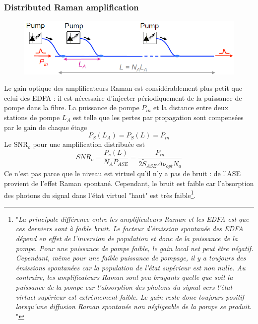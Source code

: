 \subsubsection{Distributed Raman amplification}
	\begin{figure}
	\vspace{-5mm}
	\includegraphics[scale=0.35]{ch6/image21}
	\end{figure}
Le gain optique des amplificateurs Raman est considérablement plus petit que celui des EDFA : il est 
nécessaire d'injecter périodiquement de la puissance de pompe dans la fibre. La puissance de pompe 
$P_{in}$ et la distance entre deux stations de pompe $L_A$ est telle que les pertes par propagation 
sont compensées par le gain de chaque étage
\begin{equation}
P_S(L_A)=P_S(L)=P_{in}
\end{equation}
Le SNR$_o$ pour une amplification distribuée est
\begin{equation}
SN{R_o} = \frac{{{P_s}(L)}}{{{N_A}P_{ASE}^{}}} = \frac{{{P_{in}}}}{{2{{\tilde S}_{ASE}}\Delta {\nu _{opt}}{N_a}}}
\end{equation}
Ce n'est pas parce que le niveau est virtuel qu'il n'y a pas de bruit : de l'ASE provient de l'effet Raman
spontané. Cependant, le bruit est faible car l'absorption des photons du signal dans l'état virtuel "haut" 
est très faible\footnote{"\textit{La principale différence entre les amplificateurs Raman et les EDFA est que ces derniers sont à faible bruit. Le facteur d'émission spontanée des EDFA dépend en effet de l'inversion de population et donc de la puissance de la pompe. Pour une puissance de pompe faible, le gain local net peut être négatif. Cependant, même pour une faible puissance de pompage, il y a toujours des émissions spontanées car la population de l'état supérieur est non nulle. Au contraire, les amplificateurs Raman sont peu bruyants quelle que soit la puissance de la pompe car l'absorption des photons du signal vers l'état virtuel supérieur est extrêmement faible. Le gain reste donc toujours positif lorsqu'une diffusion Raman spontanée non négligeable de la pompe se produit.
}"}.

